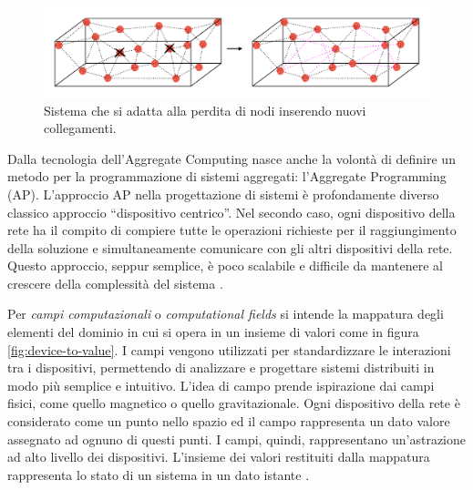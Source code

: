 \documentclass[12pt,a4paper,openright,twoside]{book}
\begin{document}
\begin{figure}
    \centering
    \includegraphics[width=.9\linewidth]{figures/lost-nodes.pdf}
    \caption{Sistema che si adatta alla perdita di nodi inserendo nuovi collegamenti.}
    \label{fig:lost-nodes}
\end{figure}

Dalla tecnologia dell'Aggregate Computing nasce anche la volontà di definire un metodo per la programmazione di sistemi aggregati: l'Aggregate Programming (AP). 
L'approccio \ac{AP} nella progettazione di sistemi è profondamente diverso classico approccio ``dispositivo centrico''.
Nel secondo caso, ogni dispositivo della rete ha il compito di compiere tutte le operazioni richieste per il raggiungimento della soluzione e simultaneamente comunicare con gli altri dispositivi della rete. Questo approccio, seppur semplice, è poco scalabile e difficile da mantenere al crescere della complessità del sistema \cite{Pianini2017}. 


Per \textit{campi computazionali} o \textit{computational fields} si intende la mappatura degli elementi del dominio in cui si opera in un insieme di valori come in figura \ref{fig:device-to-value}.
I campi vengono utilizzati per standardizzare le interazioni tra i dispositivi, permettendo di analizzare e progettare sistemi distribuiti in modo più semplice e intuitivo. L'idea di campo prende ispirazione dai campi fisici, come quello magnetico o quello gravitazionale. Ogni dispositivo della rete è considerato come un punto nello spazio ed il campo rappresenta un dato valore assegnato ad ognuno di questi punti. I campi, quindi, rappresentano un'astrazione ad alto livello dei dispositivi. L'insieme dei valori restituiti dalla mappatura rappresenta lo stato di un sistema in un dato istante \cite{Audrito2019}.
\end{document}
